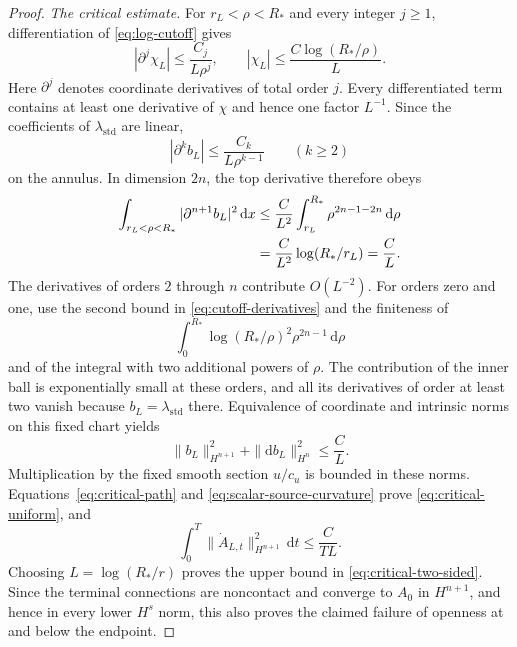 \documentclass[11pt,a4paper]{article}
\numberwithin{equation}{section}
\theoremstyle{definition}
\theoremstyle{remark}
\newcommand{\dd}{\mathrm d}
\begin{document}
\begin{proof}
\smallskip\noindent
\emph{The critical estimate.}
For $r_L<\rho<R_*$ and every integer $j\geq1$, differentiation of
\eqref{eq:log-cutoff} gives
\begin{equation}\label{eq:cutoff-derivatives}
 |\partial^j\chi_L|\leq\frac{C_j}{L\rho^j},\qquad
 |\chi_L|\leq\frac{C\log(R_*/\rho)}{L}.
\end{equation}
Here $\partial^j$ denotes coordinate derivatives of total order $j$.
Every differentiated term contains at least one derivative of $\chi$ and hence
one factor $L^{-1}$. Since the coefficients of $\lambda_{\mathrm{std}}$ are linear,
\begin{equation}\label{eq:primitive-derivatives}
 |\partial^k b_L|\leq\frac{C_k}{L\rho^{k-1}}
 \qquad(k\geq2)
\end{equation}
on the annulus. In dimension $2n$, the top derivative therefore obeys
\begin{align}
 \int_{r_L<\rho<R_*}|\partial^{n+1}b_L|^2\,\dd x
 &\leq\frac{C}{L^2}
       \int_{r_L}^{R_*}\rho^{2n-1-2n}\,\dd\rho \notag\\
 &=\frac{C}{L^2}\log(R_*/r_L)=\frac{C}{L}.
 \label{eq:critical-top-derivative}
\end{align}
The derivatives of orders $2$ through $n$ contribute $O(L^{-2})$.
For orders zero and one, use the second bound in
\eqref{eq:cutoff-derivatives} and the finiteness of
\[
 \int_0^{R_*}\log(R_*/\rho)^2\rho^{2n-1}\,\dd\rho
\]
and of the integral with two additional powers of $\rho$. The contribution
of the inner ball is exponentially small at these orders, and all its
derivatives of order at least two vanish because $b_L=\lambda_{\mathrm{std}}$ there.
Equivalence of coordinate and intrinsic norms on this fixed chart yields
\begin{equation}\label{eq:critical-b-norm}
 \|b_L\|_{H^{n+1}}^2+\|\dd b_L\|_{H^n}^2\leq\frac{C}{L}.
\end{equation}
Multiplication by the fixed smooth section $u/c_u$ is bounded in these norms.
Equations~\eqref{eq:critical-path} and
\eqref{eq:scalar-source-curvature} prove
\eqref{eq:critical-uniform}, and
\[
 \int_0^T\|\dot A_{L,t}\|_{H^{n+1}}^2\,\dd t
 \leq\frac{C}{TL}.
\]
Choosing $L=\log(R_*/r)$ proves the upper bound in
\eqref{eq:critical-two-sided}. Since the terminal connections are noncontact
and converge to $A_0$ in $H^{n+1}$, and hence in every lower $H^s$ norm,
this also proves the claimed failure of openness at and below the endpoint.


\end{proof}
\end{document}
